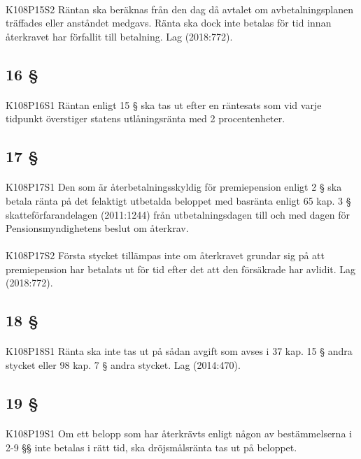 \documentclass[a4paper,notitlepage,openany,10pt]{book}
\begin{document}
\paragraph*{}
{\tiny K108P15S2}
Räntan ska beräknas från den dag då avtalet om avbetalningsplanen träffades eller anståndet medgavs. Ränta ska dock inte betalas för tid innan återkravet har förfallit till betalning.
Lag (2018:772).
\subsection*{16 §}
\paragraph*{}
{\tiny K108P16S1}
Räntan enligt 15 § ska tas ut efter en räntesats som vid varje tidpunkt överstiger statens utlåningsränta med 2 procentenheter.
\subsection*{17 §}
\paragraph*{}
{\tiny K108P17S1}
Den som är återbetalningsskyldig för premiepension enligt 2 § ska betala ränta på det felaktigt utbetalda beloppet med basränta enligt 65 kap. 3 § skatteförfarandelagen (2011:1244) från utbetalningsdagen till och med dagen för Pensionsmyndighetens beslut om återkrav.
\paragraph*{}
{\tiny K108P17S2}
Första stycket tillämpas inte om återkravet grundar sig på att premiepension har betalats ut för tid efter det att den försäkrade har avlidit.
Lag (2018:772).
\subsection*{18 §}
\paragraph*{}
{\tiny K108P18S1}
Ränta ska inte tas ut på sådan avgift som avses i 37 kap. 15 § andra stycket eller 98 kap. 7 § andra stycket.
Lag (2014:470).
\subsection*{19 §}
\paragraph*{}
{\tiny K108P19S1}
Om ett belopp som har återkrävts enligt någon av bestämmelserna i 2-9 §§ inte betalas i rätt tid, ska dröjsmålsränta tas ut på beloppet.
\end{document}
